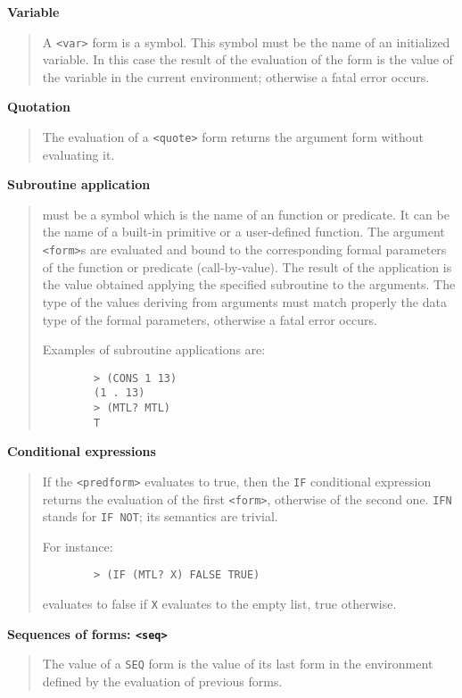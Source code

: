 {\bf Variable}
\begin{quote}
	A {\tt <var>} form is a symbol. This symbol must be the name of an
	initialized variable.
	In this case the result of the evaluation of the form is the value of the
	variable in the current environment; otherwise a fatal error occurs.
\end{quote}

{\bf Quotation}
\begin{quote}
	The evaluation of a {\tt <quote>} form returns the argument form without
	evaluating it.
\end{quote}

{\bf Subroutine application}
\begin{quote}
	{\tt <subroutine name>} must be a symbol which is the name of an {\HG}
	function or predicate.
	It can be the name of a built-in primitive or a user-defined function.
	The argument {\tt <form>}s are evaluated and bound to the corresponding
	formal parameters of the function or predicate (call-by-value).
	The result of the application is the value obtained applying the specified
	subroutine to the arguments.
	The type of the values deriving from arguments must match properly the data
	type of the formal parameters, otherwise a fatal error occurs.

	Examples of subroutine applications are:
	\begin{verbatim}
		> (CONS 1 13)
		(1 . 13)
		> (MTL? MTL)
		T
	\end{verbatim}
\end{quote}

{\bf Conditional expressions}
\begin{quote}
	If the {\tt <predform>} evaluates to true, then the {\tt IF} conditional
	expression returns the evaluation of the first {\tt <form>}, otherwise of
	the second one.
	{\tt IFN} stands for {\tt IF NOT}; its semantics are trivial.

	For instance:
	\begin{verbatim}
		> (IF (MTL? X) FALSE TRUE)
	\end{verbatim}
	evaluates to false if {\tt X} evaluates to the empty list, true otherwise.
\end{quote}

{\bf Sequences of forms: \verb+<seq>+}
\begin{quote}
	The value of a {\tt SEQ} form is the value of its last form in the
	environment defined by the evaluation of previous forms.
\end{quote}

